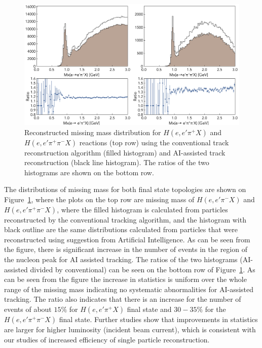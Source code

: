  \begin{figure}[!ht]
\begin{center}
 \includegraphics[width=6.0in]{images/physics_scan.pdf}
\caption {Reconstructed missing mass distribution for $H(e,e'\pi^+X)$ and $H(e,e'\pi^+\pi^-X)$ reactions (top row) using the conventional track reconstruction algorithm (filled histogram) and  AI-assisted track reconstruction (black line histogram). The ratios of the two histograms are shown on the bottom row. }
 \label{physics:outcome}
 \end{center}
\end{figure}

The distributions of missing mass for both final state topologies are shown on Figure~\ref{physics:outcome}, where the plots 
on the top row are missing mass of $H(e,e'\pi^-X)$ and $H(e,e'\pi^+\pi^-X)$, where the filled histogram is calculated from 
particles reconstructed by the conventional tracking algorithm, and the histogram with black outline are the same distributions 
calculated from particles that were reconstructed using suggestion from Artificial Intelligence. As can be seen from the figure, 
there is significant increase in the number of events in the region of the nucleon peak for AI assisted
tracking. The ratios of the two histograms (AI-assisted divided by conventional) can be seen on the bottom row of 
Figure~\ref{physics:outcome}. As can be seen from the figure the increase in statistics is uniform over the whole range of the 
missing mass indicating no systematic abnormalities for AI-assisted tracking. The ratio also indicates that there is an increase 
for the number of events of about $15\%$ for $H(e,e'\pi^+X)$ final state and $30-35\%$ for the $H(e,e'\pi^+\pi^-X)$
final state. Further studies show that improvements in statistics are larger for higher luminosity (incident beam current), which is consistent with our studies of increased efficiency of single particle reconstruction.


